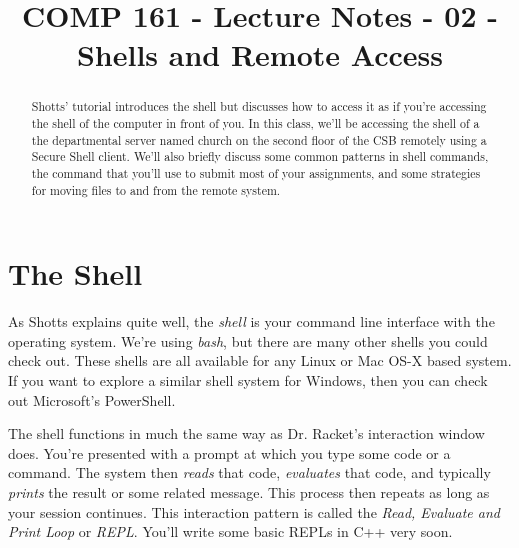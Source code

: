 \documentclass[]{tufte-handout}
\title{COMP 161 - Lecture Notes - 02 - Shells and Remote Access}
\begin{document}
\maketitle

\begin{abstract}
Shotts' tutorial introduces the shell but discusses how to access it as if you're accessing the shell of the computer in front of you.  In this class, we'll be accessing the shell of a the departmental server named church on the second floor of the CSB remotely using a Secure Shell client. We'll also briefly discuss some common patterns in shell commands, the command that you'll use to submit most of your assignments, and some strategies for moving files to and from the remote system. 
\end{abstract}

\section{The Shell}

As Shotts explains quite well, the \textit{shell} is your command line interface with the operating system.  We're using \textit{bash}, but there are many other shells you could check out.  These shells are all available for any Linux or Mac OS-X based system. If you want to explore a similar shell system for Windows, then you can check out Microsoft's PowerShell.    

The shell functions in much the same way as Dr. Racket's interaction window does. You're presented with a prompt at which you type some code or a command. The system then \textit{reads} that code, \textit{evaluates} that code, and typically \textit{prints} the result or some related message. This process then repeats as long as your session continues. This interaction pattern is called the \textit{Read, Evaluate and Print Loop} or \textit{REPL}. You'll write some basic REPLs in C++ very soon. 
\end{document}
